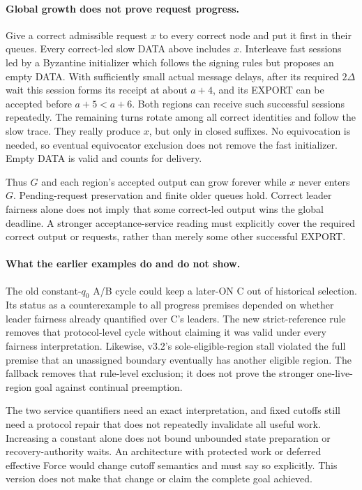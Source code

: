 \documentclass[11pt,a4paper]{article}
\newcounter{protocol}
\begin{document}
\paragraph{Global growth does not prove request progress.}
Give a correct admissible request $x$ to every correct node and put it
first in their queues. Every correct-led slow DATA above includes $x$.
Interleave fast sessions led by a Byzantine initializer which follows
the signing rules but proposes an empty DATA. With sufficiently small
actual message delays, after its required $2\Delta$ wait this session
forms its receipt at about $a+4$, and its EXPORT can be accepted before
$a+5<a+6$. Both regions can receive such successful sessions repeatedly.
The remaining turns rotate among all correct identities and follow the
slow trace. They really produce $x$, but only in closed suffixes.
No equivocation is needed, so eventual equivocator exclusion does not
remove the fast initializer. Empty DATA is valid and counts for delivery.

Thus $G$ and each region's accepted output can grow forever while $x$
never enters $G$. Pending-request preservation and finite older queues
hold. Correct leader fairness alone does not imply that some correct-led
output wins the global deadline. A stronger acceptance-service reading
must explicitly cover the required correct output or requests, rather
than merely some other successful EXPORT.

\paragraph{What the earlier examples do and do not show.}
The old constant-$q_0$ A/B cycle could keep a later-ON C out of historical
selection. Its status as a counterexample to all progress premises
depended on whether leader fairness already quantified over C's leaders.
The new strict-reference rule removes that protocol-level cycle without
claiming it was valid under every fairness interpretation.
Likewise, v3.2's sole-eligible-region stall violated the full premise
that an unassigned boundary eventually has another eligible region.
The fallback removes that rule-level exclusion; it does not prove the
stronger one-live-region goal against continual preemption.

The two service quantifiers need an exact interpretation, and fixed
cutoffs still need a protocol repair that does not repeatedly invalidate
all useful work. Increasing a constant alone does not bound unbounded
state preparation or recovery-authority waits. An architecture with
protected work or deferred effective Force would change cutoff semantics
and must say so explicitly. This version does not make that change or
claim the complete goal achieved.
\end{document}
